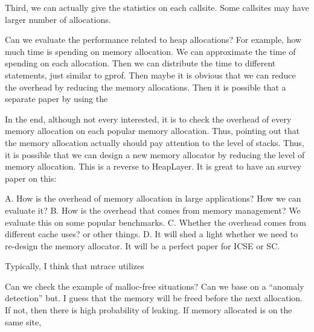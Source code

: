 Third, we can actually give the statistics on each callsite. Some callsites may have larger number of allocations. 

Can we evaluate the performance related to heap allocations? For example, how much time is spending on memory allocation. 
We can approximate the time of spending on each allocation. Then we can distribute the time to different statements, just similar to gprof. Then maybe it is obvious that we can reduce the overhead by reducing the memory allocations. Then it is possible that a separate paper by using the 


In the end, although not every interested, it is to check the overhead of every memory allocation on each popular memory allocation. Thus, pointing out that the memory allocation actually should pay attention to the level of stacks. Thus, it is possible that we can design a new memory allocator by reducing the level of memory allocation. This is a reverse to HeapLayer. It is great to have an survey paper on this:

A. How is the overhead of memory allocation in large applications? How we can evaluate it? 
B. How is the overhead that comes from memory management? We evaluate this on some popular benchmarks. 
C. Whether the overhead comes from different cache uses? or other things. 
D. It will shed a light whether we need to re-design the memory allocator. 
It will be a perfect paper for ICSE or SC.


Typically, I think that mtrace utilizes 

Can we check the example of malloc-free situations?
Can we base on a ``anomaly detection'' but.  
I guess that the memory will be freed before the next allocation. If not, then there is high probability of leaking. If memory allocated is on the same site,  
